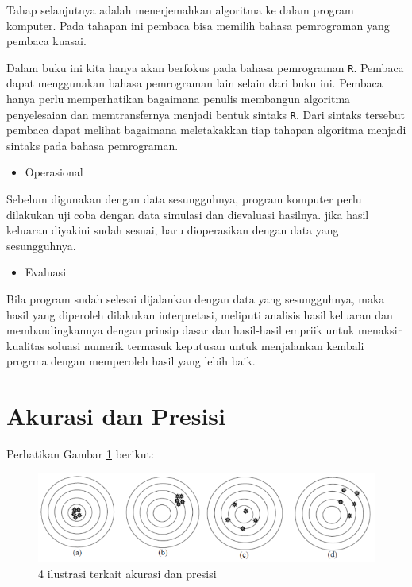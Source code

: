 \documentclass[
]{book}
\providecommand{\tightlist}{%
  \setlength{\itemsep}{0pt}\setlength{\parskip}{0pt}}
\theoremstyle{definition}
\theoremstyle{definition}
\theoremstyle{definition}
\theoremstyle{definition}
\theoremstyle{remark}
\begin{document}
Tahap selanjutnya adalah menerjemahkan algoritma ke dalam program komputer. Pada tahapan ini pembaca bisa memilih bahasa pemrograman yang pembaca kuasai.

Dalam buku ini kita hanya akan berfokus pada bahasa pemrograman \texttt{R}. Pembaca dapat menggunakan bahasa pemrograman lain selain dari buku ini. Pembaca hanya perlu memperhatikan bagaimana penulis membangun algoritma penyelesaian dan memtransfernya menjadi bentuk sintaks \texttt{R}. Dari sintaks tersebut pembaca dapat melihat bagaimana meletakakkan tiap tahapan algoritma menjadi sintaks pada bahasa pemrograman.

\begin{itemize}
\tightlist
\item
  Operasional
\end{itemize}

Sebelum digunakan dengan data sesungguhnya, program komputer perlu dilakukan uji coba dengan data simulasi dan dievaluasi hasilnya. jika hasil keluaran diyakini sudah sesuai, baru dioperasikan dengan data yang sesungguhnya.

\begin{itemize}
\tightlist
\item
  Evaluasi
\end{itemize}

Bila program sudah selesai dijalankan dengan data yang sesungguhnya, maka hasil yang diperoleh dilakukan interpretasi, meliputi analisis hasil keluaran dan membandingkannya dengan prinsip dasar dan hasil-hasil empriik untuk menaksir kualitas soluasi numerik termasuk keputusan untuk menjalankan kembali progrma dengan memperoleh hasil yang lebih baik.

\hypertarget{acuracy}{%
\section{Akurasi dan Presisi}\label{acuracy}}

Perhatikan Gambar \ref{fig:akurasi} berikut:

\begin{figure}

{\centering \includegraphics[width=0.75\linewidth]{./images/akurasi} 

}

\caption{4 ilustrasi terkait akurasi dan presisi}\label{fig:akurasi}
\end{figure}
\end{document}
